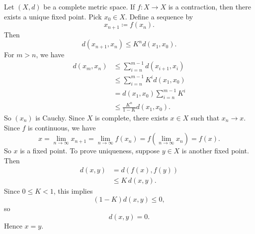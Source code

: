 \begin{theorem}{
    Let $(X,d)$ be a complete metric space.
    If $f:X\to X$ is a contraction, then there exists a unique fixed point.
}
    Pick $x_0\in X$.
    Define a sequence by
    \[
        x_{n+1} \coloneqq f(x_n).
    \]
    Then
    \[
        d(x_{n+1},x_n) \leq K^n d(x_1,x_0).
    \]
    For $m>n$, we have
    \begin{align*}
        d(x_m,x_n)
        &\leq \sum_{i=n}^{m-1} d(x_{i+1},x_i)\\
        &\leq \sum_{i=n}^{m-1} K^i d(x_1,x_0)\\
        &= d(x_1,x_0)\sum_{i=n}^{m-1} K^i\\
        &\leq \frac{K^n}{1-K} d(x_1,x_0).
    \end{align*}
    So $(x_n)$ is Cauchy.
    Since $X$ is complete, there exists $x\in X$ such that $x_n\to x$.
    Since $f$ is continuous, we have
    \[
        x = \lim_{n\to\infty} x_{n+1}
        = \lim_{n\to\infty} f(x_n)
        = f\left(\lim_{n\to\infty} x_n\right)
        = f(x).
    \]
    So $x$ is a fixed point.
    To prove uniqueness, suppose $y\in X$ is another fixed point.
    Then
    \begin{align*}
        d(x,y)
        &= d(f(x),f(y))\\
        &\leq K\,d(x,y).
    \end{align*}
    Since $0\leq K<1$, this implies
    \[
        (1-K)d(x,y)\leq 0,
    \]
    so
    \[
        d(x,y)=0.
    \]
    Hence $x=y$.
\end{theorem}